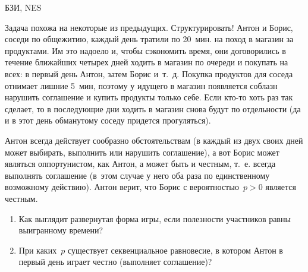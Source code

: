\begin{problem}[Соседи.]\begin{source}
БЗИ, NES
\end{source} 
{\red Задача похожа на некоторые из предыдущих. Структурировать!}
Антон и Борис, соседи по общежитию,
каждый день тратили по 20~мин. на поход в магазин за
продуктами. Им это надоело и, чтобы сэкономить время, они
договорились в течение ближайших четырех дней ходить в
магазин по очереди и покупать на всех: в первый день Антон,
затем Борис и~т.~д. Покупка продуктов для соседа отнимает
лишние 5~мин, поэтому у идущего в магазин появляется
соблазн нарушить соглашение и купить продукты только себе.
Если кто-то хоть раз так сделает, то в последующие дни
ходить в магазин снова будут по отдельности (да и в этот
день обманутому соседу придется прогуляться).

Антон всегда действует сообразно обстоятельствам (в каждый
из двух своих дней может выбирать, выполнить или нарушить
соглашение), а вот Борис может являться оппортунистом, как
Антон, а может быть и честным, т.~е. всегда выполнять
соглашение (в~этом случае у него оба раза по единственному
возможному действию). Антон верит, что Борис с
вероятностью~$p>0$ является честным.

\begin{enumerate}
  \item Как выглядит развернутая форма игры, если полезности
  участников равны выигранному времени?
  \item При каких~$p$ существует секвенциальное  равновесие,
  в котором Антон в первый день играет честно (выполняет
  соглашение)?
\end{enumerate}






\begin{sol}

\end{sol}
\end{problem}




